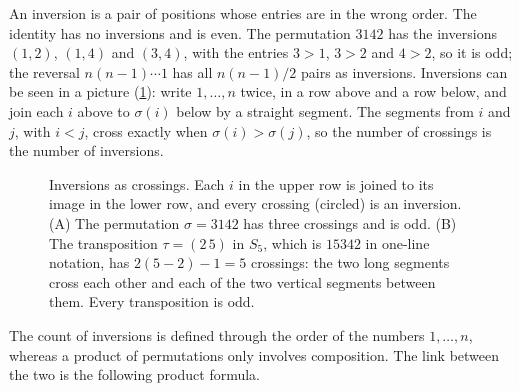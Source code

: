 An inversion is a pair of positions whose entries are in the wrong order. The identity has no inversions and is even. The permutation $3142$ has the inversions $(1,2)$, $(1,4)$ and $(3,4)$, with the entries $3>1$, $3>2$ and $4>2$, so it is odd; the reversal $n(n-1)\cdots1$ has all $n(n-1)/2$ pairs as inversions. Inversions can be seen in a picture (\cref{fig:permutation-crossings}): write $1,\ldots,n$ twice, in a row above and a row below, and join each $i$ above to $\sigma(i)$ below by a straight segment. The segments from $i$ and $j$, with $i<j$, cross exactly when $\sigma(i)>\sigma(j)$, so the number of crossings is the number of inversions.

\begin{figure}
\hfill
{}
\caption{Inversions as crossings. Each $i$ in the upper row is joined to its image in the lower row, and every crossing (circled) is an inversion. (A) The permutation $\sigma=3142$ has three crossings and is odd. (B) The transposition $\tau=(2\,5)$ in $S_5$, which is $15342$ in one-line notation, has $2(5-2)-1=5$ crossings: the two long segments cross each other and each of the two vertical segments between them. Every transposition is odd.}
\label{fig:permutation-crossings}
\end{figure}

The count of inversions is defined through the order of the numbers $1,\ldots,n$, whereas a product of permutations only involves composition. The link between the two is the following product formula.

